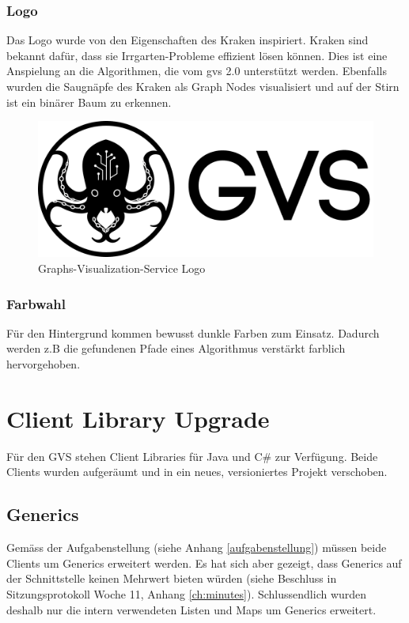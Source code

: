 \documentclass[11pt,a4paper,english,oneside]{book}
\numberwithin{equation}{chapter}
\begin{document}
	\subsubsection{Logo}
	Das Logo wurde von den Eigenschaften des Kraken \cite{kraken} inspiriert. Kraken sind bekannt dafür, dass sie Irrgarten-Probleme effizient lösen können. Dies ist eine Anspielung an die Algorithmen, die vom \gls{gvs} 2.0 unterstützt werden. Ebenfalls wurden die Saugnäpfe des Kraken als Graph Nodes visualisiert und auf der Stirn ist ein binärer Baum zu erkennen. 
	
	\begin{figure}[h!]
		\centering
		\includegraphics[width=0.5\linewidth]{assets/images/logo}
		\caption[GVS Logo]{Graphs-Visualization-Service Logo}
		\label{fig:logo}
	\end{figure}
	
	\subsubsection{Farbwahl}
	Für den Hintergrund kommen bewusst dunkle Farben zum Einsatz. Dadurch werden z.B die gefundenen Pfade eines Algorithmus verstärkt farblich hervorgehoben. 
	
	
		
	\section{Client Library Upgrade}
	Für den GVS stehen Client Libraries für Java und C\# zur Verfügung. Beide Clients wurden aufgeräumt und in ein neues, versioniertes Projekt verschoben.
	
	\subsection{Generics}
	Gemäss der Aufgabenstellung (siehe Anhang \ref{aufgabenstellung}) müssen beide Clients um Generics erweitert werden. Es hat sich aber gezeigt, dass Generics auf der Schnittstelle keinen Mehrwert bieten würden (siehe Beschluss in Sitzungsprotokoll Woche 11, Anhang \ref{ch:minutes}). Schlussendlich wurden deshalb nur die intern verwendeten Listen und Maps um Generics erweitert.
	
\end{document}
